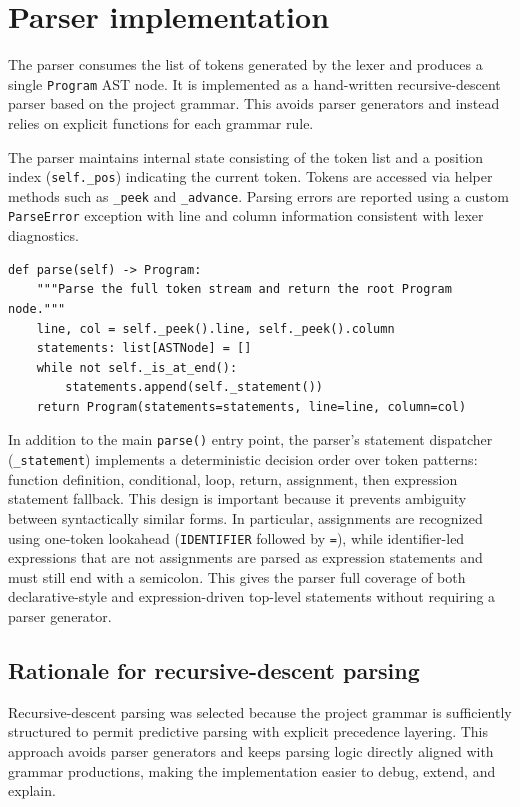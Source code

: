 \section{Parser implementation}
The parser consumes the list of tokens generated by the lexer and produces a
single \texttt{Program} AST node. It is implemented as a hand-written
recursive-descent parser based on the project grammar. This avoids parser
generators and instead relies on explicit functions for each grammar rule.

The parser maintains internal state consisting of the token list and a position
index (\texttt{self.\_pos}) indicating the current token. Tokens are accessed
via helper methods such as \texttt{\_peek} and \texttt{\_advance}. Parsing
errors are reported using a custom \texttt{ParseError} exception with line and
column information consistent with lexer diagnostics.

\begin{lstlisting}
def parse(self) -> Program:
    """Parse the full token stream and return the root Program node."""
    line, col = self._peek().line, self._peek().column
    statements: list[ASTNode] = []
    while not self._is_at_end():
        statements.append(self._statement())
    return Program(statements=statements, line=line, column=col)
\end{lstlisting}

In addition to the main \texttt{parse()} entry point, the parser's statement
dispatcher (\texttt{\_statement}) implements a deterministic decision order
over token patterns: function definition, conditional, loop, return,
assignment, then expression statement fallback. This design is important
because it prevents ambiguity between syntactically similar forms. In
particular, assignments are recognized using one-token lookahead
(\texttt{IDENTIFIER} followed by \texttt{=}), while identifier-led expressions
that are not assignments are parsed as expression statements and must still end
with a semicolon. This gives the parser full coverage of both declarative-style
and expression-driven top-level statements without requiring a parser generator.

\subsection{Rationale for recursive-descent parsing}
Recursive-descent parsing was selected because the project grammar is
sufficiently structured to permit predictive parsing with explicit precedence
layering. This approach avoids parser generators and keeps parsing logic
directly aligned with grammar productions, making the implementation easier
to debug, extend, and explain.

